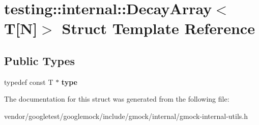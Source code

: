 \hypertarget{structtesting_1_1internal_1_1_decay_array_3_01_t[_n]_4}{}\section{testing\+:\+:internal\+:\+:Decay\+Array$<$ T\mbox{[}N\mbox{]}$>$ Struct Template Reference}
\label{structtesting_1_1internal_1_1_decay_array_3_01_t[_n]_4}
\subsection*{Public Types}
\begin{DoxyCompactItemize}
\item 
\mbox{\label{structtesting_1_1internal_1_1_decay_array_3_01_t[_n]_4_afc22a88da484b94639501c07fb90bfd3}} 
typedef const T $\ast$ {\bfseries type}
\end{DoxyCompactItemize}


The documentation for this struct was generated from the following file\+:\begin{DoxyCompactItemize}
\item 
vendor/googletest/googlemock/include/gmock/internal/gmock-\/internal-\/utils.\+h\end{DoxyCompactItemize}

